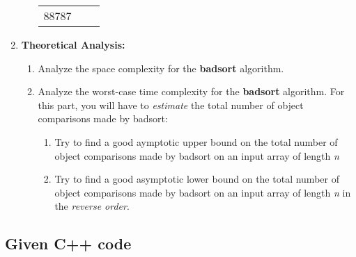 \begin{enumerate}
\begin{enumerate}
\begin{tabular}{l l l}
88787 &           &         \\
  \end{tabular}
  \end{enumerate}
\item \textbf{Theoretical Analysis:}
  \begin{enumerate}
  \item Analyze the space complexity for the \textbf{badsort} algorithm.
  \item Analyze the worst-case time complexity for the \textbf{badsort} algorithm. For this part, you will have to \emph{estimate} the total number of object comparisons made by badsort:
    \begin{enumerate}
    \item Try to find a good aymptotic upper bound on the total number of object comparisons made by badsort on an input array of length \emph{n}
    \item Try to find a good asymptotic lower bound on the total number of object comparisons made by badsort on an input array of length \emph{n} in the \emph{reverse order}.
    \end{enumerate}
  \end{enumerate}
\end{enumerate}

\subsection{Given C++ code}

